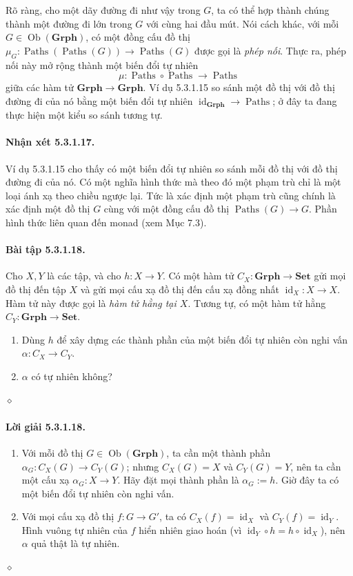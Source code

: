 Rõ ràng, cho một dãy đường đi như vậy trong $G$, ta có thể hợp thành chúng thành một đường đi lớn trong $G$ với cùng hai đầu mút. Nói cách khác, với mỗi $G\in\operatorname{Ob}(\mathbf{Grph})$, có một đồng cấu đồ thị $\mu_G:\operatorname{Paths}(\operatorname{Paths}(G))\to\operatorname{Paths}(G)$ được gọi là \emph{phép nối}. Thực ra, phép nối này mở rộng thành một biến đổi tự nhiên
\[\mu:\operatorname{Paths}\circ\operatorname{Paths}\longrightarrow\operatorname{Paths}\]
giữa các hàm tử $\mathbf{Grph}\to\mathbf{Grph}$. Ví dụ 5.3.1.15 so sánh một đồ thị với đồ thị đường đi của nó bằng một biến đổi tự nhiên $\operatorname{id}_{\mathbf{Grph}}\to\operatorname{Paths}$; ở đây ta đang thực hiện một kiểu so sánh tương tự.
\paragraph{Nhận xét 5.3.1.17.} Ví dụ 5.3.1.15 cho thấy có một biến đổi tự nhiên so sánh mỗi đồ thị với đồ thị đường đi của nó. Có một nghĩa hình thức mà theo đó một phạm trù chỉ là một loại ánh xạ theo chiều ngược lại. Tức là xác định một phạm trù cũng chính là xác định một đồ thị $G$ cùng với một đồng cấu đồ thị $\operatorname{Paths}(G)\to G$. Phần hình thức liên quan đến monad (xem Mục 7.3).
\paragraph{Bài tập 5.3.1.18.} Cho $X,Y$ là các tập, và cho $h:X\to Y$. Có một hàm tử $C_X:\mathbf{Grph}\to\mathbf{Set}$ gửi mọi đồ thị đến tập $X$ và gửi mọi cấu xạ đồ thị đến cấu xạ đồng nhất $\operatorname{id}_X:X\to X$. Hàm tử này được gọi là \emph{hàm tử hằng tại $X$}. Tương tự, có một hàm tử hằng $C_Y:\mathbf{Grph}\to\mathbf{Set}$.
\begin{enumerate}[label=\alph*.]
\item Dùng $h$ để xây dựng các thành phần của một biến đổi tự nhiên còn nghi vấn $\alpha:C_X\to C_Y$.
\item $\alpha$ có tự nhiên không?
\end{enumerate}\hfill$\diamond$
\paragraph{Lời giải 5.3.1.18.}
\begin{enumerate}[label=\alph*.]
\item Với mỗi đồ thị $G\in\operatorname{Ob}(\mathbf{Grph})$, ta cần một thành phần $\alpha_G:C_X(G)\to C_Y(G)$; nhưng $C_X(G)=X$ và $C_Y(G)=Y$, nên ta cần một cấu xạ $\alpha_G:X\to Y$. Hãy đặt mọi thành phần là $\alpha_G:=h$. Giờ đây ta có một biến đổi tự nhiên còn nghi vấn.
\item Với mọi cấu xạ đồ thị $f:G\to G'$, ta có $C_X(f)=\operatorname{id}_X$ và $C_Y(f)=\operatorname{id}_Y$. Hình vuông tự nhiên của $f$ hiển nhiên giao hoán (vì $\operatorname{id}_Y\circ h=h\circ\operatorname{id}_X$), nên $\alpha$ quả thật là tự nhiên.
\end{enumerate}\hfill$\diamond$

